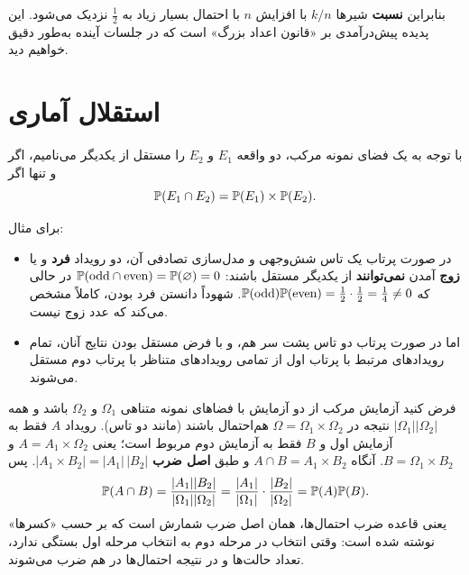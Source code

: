 \begin{center}
\end{center}

بنابراین \textbf{نسبت} شیرها $k/n$ با افزایش $n$ با احتمال بسیار زیاد به $\frac12$ نزدیک می‌شود. این پدیده پیش‌درآمدی بر «قانون اعداد بزرگ» است که در جلسات آینده به‌طور دقیق خواهیم دید.

\section{استقلال آماری }\label{sec:indep}

\begin{definition}
با توجه به یک فضای نمونه مرکب، دو واقعه $E_1$ و $E_2$ را مستقل از یکدیگر می‌نامیم، اگر و تنها اگر
\[\mathbb{P}(E_1\cap E_2)=\mathbb{P}(E_1)\times\mathbb{P}(E_2).\]
\end{definition}

برای مثال:
\begin{itemize}
\item در صورت پرتاب یک تاس شش‌وجهی و مدل‌سازی تصادفی آن، دو رویداد \textbf{فرد} و یا \textbf{زوج} آمدن \textbf{نمی‌توانند} از یکدیگر مستقل باشند: $\mathbb{P}(\text{odd}\cap\text{even})=\mathbb{P}(\varnothing)=0$ در حالی که $\mathbb{P}(\text{odd})\mathbb{P}(\text{even})=\frac12\cdot\frac12=\frac14\neq0$. شهوداً دانستن فرد بودن، کاملاً مشخص می‌کند که عدد زوج نیست.
\item اما در صورت پرتاب دو تاس پشت سر هم، و با فرض مستقل بودن نتایج آنان، تمام رویدادهای مرتبط با پرتاب اول از تمامی رویدادهای متناظر با پرتاب دوم مستقل می‌شوند.
\end{itemize}

\begin{question}
\begin{answer}
فرض کنید آزمایش مرکب از دو آزمایش با فضاهای نمونه متناهی $\Omega_1$ و $\Omega_2$ باشد و همه $|\Omega_1||\Omega_2|$ نتیجه در $\Omega=\Omega_1\times\Omega_2$ هم‌احتمال باشند (مانند دو تاس). رویداد $A$ فقط به آزمایش اول و $B$ فقط به آزمایش دوم مربوط است؛ یعنی $A=A_1\times\Omega_2$ و $B=\Omega_1\times B_2$. آنگاه $A\cap B=A_1\times B_2$ و طبق \textbf{اصل ضرب} $|A_1\times B_2|=|A_1|\,|B_2|$. پس
\[
\mathbb{P}(A\cap B)=\frac{|A_1||B_2|}{|\Omega_1||\Omega_2|}=\frac{|A_1|}{|\Omega_1|}\cdot\frac{|B_2|}{|\Omega_2|}=\mathbb{P}(A)\mathbb{P}(B).
\]
یعنی قاعده ضرب احتمال‌ها، همان اصل ضرب شمارش است که بر حسب «کسرها» نوشته شده است: وقتی انتخاب در مرحله دوم به انتخاب مرحله اول بستگی ندارد، تعداد حالت‌ها و در نتیجه احتمال‌ها در هم ضرب می‌شوند.
\end{answer}
\end{question}

